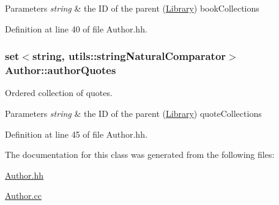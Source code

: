\begin{DoxyParams}{Parameters}
{\em string} & the ID of the parent (\hyperlink{class_library}{Library}) book\+Collection\textquotesingle{}s \\
\hline
\end{DoxyParams}


Definition at line 40 of file Author.\+hh.

\subsubsection[{\texorpdfstring{author\+Quotes}{authorQuotes}}]{\setlength{\rightskip}{0pt plus 5cm}set$<$string, {\bf utils\+::string\+Natural\+Comparator}$>$ Author\+::author\+Quotes\hspace{0.3cm}{\ttfamily [private]}}\hypertarget{class_author_a117bc50449e2f8d61f30632dde7d73ff}{}\label{class_author_a117bc50449e2f8d61f30632dde7d73ff}


Ordered collection of quotes. 


\begin{DoxyParams}{Parameters}
{\em string} & the ID of the parent (\hyperlink{class_library}{Library}) quote\+Collection\textquotesingle{}s \\
\hline
\end{DoxyParams}


Definition at line 45 of file Author.\+hh.



The documentation for this class was generated from the following files\+:\begin{DoxyCompactItemize}
\item 
\hyperlink{_author_8hh}{Author.\+hh}\item 
\hyperlink{_author_8cc}{Author.\+cc}\end{DoxyCompactItemize}
